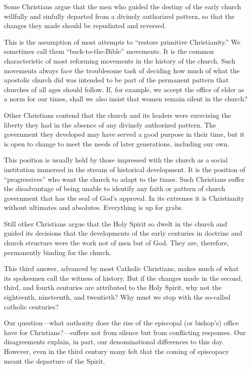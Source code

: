 \begin{numlist}
\item[1.] Some Christians argue that the men who guided the destiny of the early church willfully
  and sinfully departed from a divinely authorized pattern, so that the changes they made should be
  repudiated and reversed.

  This is the assumption of most attempts to “restore primitive Christianity.” We sometimes call
  them “back-to-the-Bible” movements. It is the common characteristic of most reforming movements in
  the history of the church. Such movements always face the troublesome task of deciding how much of
  what the apostolic church did was intended to be part of the permanent pattern that churches of
  all ages should follow. If, for example, we accept the office of elder as a norm for our times,
  shall we also insist that women remain silent in the church?
\item[2.] Other Christians contend that the church and its leaders were exercising the liberty they
  had in the absence of any divinely authorized pattern. The government they developed may have
  served a good purpose in their time, but it is open to change to meet the needs of later
  generations, including our own.

  This position is usually held by those impressed with the church as a social institution immersed
  in the stream of historical development. It is the position of “progressives” who want the church
  to adapt to the times. Such Christians suffer the disadvantage of being unable to identify any
  faith or pattern of church government that has the seal of God’s approval. In its extremes it is
  Christianity without ultimates and absolutes. Everything is up for grabs.
\item[3.] Still other Christians argue that the Holy Spirit so dwelt in the church and guided its
  decisions that the developments of the early centuries in doctrine and church structure were the
  work not of men but of God. They are, therefore, permanently binding for the church.

  This third answer, advanced by most Catholic Christians, makes much of what its spokesmen call the
  witness of history. But if the changes made in the second, third, and fourth centuries are
  attributed to the Holy Spirit, why not the eighteenth, nineteenth, and twentieth? Why must we stop
  with the so-called catholic centuries?
\end{numlist}

Our question—what authority does the rise of the episcopal (or bishop’s) office have for
Christians?—suffers not from silence but from conflicting responses. Our disagreements explain, in
part, our denominational differences to this day. However, even in the third century many felt that
the coming of episcopacy meant the departure of the Spirit.

